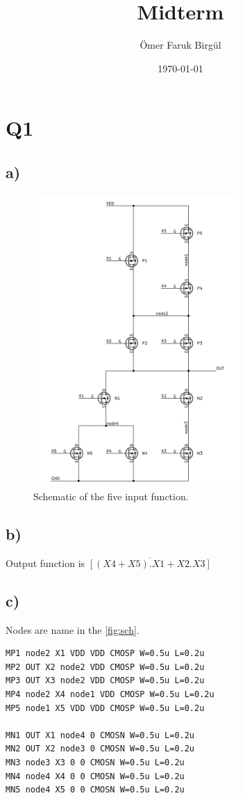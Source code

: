\documentclass[a4paper,10pt]{article}
\author{Ömer Faruk Birgül}
\title{Midterm}
\date{\today}
\begin{document}
\maketitle
\section*{Q1}
\subsection*{a)}
\begin{figure}[ht!]
 \centering
 \includegraphics[width=0.7\textwidth]{output.pdf}
 \caption{Schematic of the five input function.}
 \label{fig:sch}
\end{figure}

\newpage
\subsection*{b)}
Output function is $\overline{[(X4+X5).X1+X2.X3]}$

\subsection*{c)}
Nodes are name in the \autoref{fig:sch}.
\begin{verbatim}
MP1 node2 X1 VDD VDD CMOSP W=0.5u L=0.2u
MP2 OUT X2 node2 VDD CMOSP W=0.5u L=0.2u
MP3 OUT X3 node2 VDD CMOSP W=0.5u L=0.2u
MP4 node2 X4 node1 VDD CMOSP W=0.5u L=0.2u
MP5 node1 X5 VDD VDD CMOSP W=0.5u L=0.2u

MN1 OUT X1 node4 0 CMOSN W=0.5u L=0.2u
MN2 OUT X2 node3 0 CMOSN W=0.5u L=0.2u
MN3 node3 X3 0 0 CMOSN W=0.5u L=0.2u
MN4 node4 X4 0 0 CMOSN W=0.5u L=0.2u
MN5 node4 X5 0 0 CMOSN W=0.5u L=0.2u
\end{verbatim}
\end{document}
